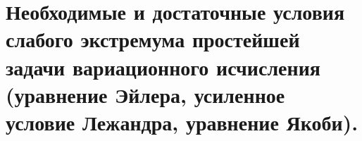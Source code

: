 \section{Необходимые и достаточные условия слабого экстремума простейшей задачи вариационного исчисления (уравнение Эйлера, усиленное условие Лежандра, уравнение Якоби).}